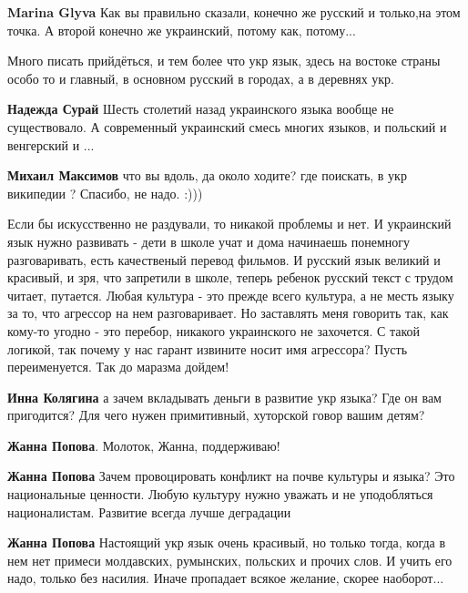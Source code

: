 \begin{itemize}
\begin{itemize}
\textbf{Marina Glyva} Как вы правильно сказали, конечно же русский и только,на этом точка. А второй конечно же украинский, потому как, потому...


Много писать прийдёться, и тем более что укр язык, здесь на востоке страны особо
то и главный, в основном русский в городах, а в деревнях укр.

\textbf{Надежда Сурай}
Шесть столетий назад украинского языка вообще не существовало.
А современный украинский смесь многих языков, и польский и венгерский и ...

\textbf{Михаил Максимов} что вы вдоль, да около ходите? где поискать, в укр википедии ? Спасибо, не надо. :)))

\end{itemize} %


Если бы искусственно не раздували, то никакой проблемы и нет. И украинский язык
нужно развивать - дети в школе учат и дома начинаешь понемногу разговаривать,
есть качественый перевод фильмов. И русский язык великий и красивый, и зря, что
запретили в школе, теперь ребенок русский текст с трудом читает, путается.
Любая культура - это прежде всего культура, а не месть языку за то, что
агрессор на нем разговаривает. Но заставлять меня говорить так, как кому-то
угодно - это перебор, никакого украинского не захочется. С такой логикой, так
почему у нас гарант извините носит имя агрессора? Пусть переименуется. Так до
маразма дойдем!

\begin{itemize} %
\textbf{Инна Колягина} а зачем вкладывать деньги в развитие укр языка? Где он вам пригодится? Для чего нужен примитивный, хуторской говор вашим детям?

\textbf{Жанна Попова}. Молоток, Жанна, поддерживаю!

\textbf{Жанна Попова} Зачем провоцировать конфликт на почве культуры и языка? Это национальные ценности. Любую культуру нужно уважать и не уподобляться националистам. Развитие всегда лучше деградации

\textbf{Жанна Попова} Настоящий укр язык очень красивый, но только тогда, когда в нем нет примеси молдавских, румынских, польских и прочих слов. И учить его надо, только без насилия. Иначе пропадает всякое желание, скорее наоборот...


\end{itemize}
\end{itemize}
